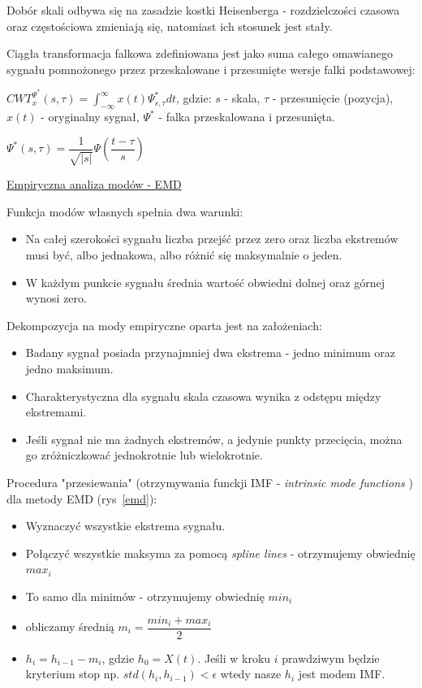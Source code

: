 Dobór skali odbywa się na zasadzie kostki Heisenberga - rozdzielczości czasowa oraz częstościowa zmieniają się, natomiast ich stosunek jest stały.

Ciągła transformacja falkowa zdefiniowana jest jako suma całego omawianego sygnału
pomnożonego przez przeskalowane i przesunięte wersje falki podstawowej:

$ CWT_x^{\Psi^*} (s, \tau) = \int_{-\infty}^{\infty} x(t) \Psi^*_{s, \tau} dt $, gdzie: \newline
$ s $ - skala, \newline
$ \tau $ - przesunięcie (pozycja), \newline
$ x(t) $ - oryginalny sygnał, \newline
$ \Psi^* $ - falka przeskalowana i przesunięta.

$ \Psi^*(s, \tau) = \dfrac{1}{\sqrt{|s|}} \Psi(\dfrac{t- \tau}{s}) $

\underline{Empiryczna analiza modów - EMD}

Funkcja modów własnych spełnia dwa warunki:
\begin{itemize}
	\item Na całej szerokości sygnału liczba przejść przez zero oraz liczba ekstremów musi być, albo jednakowa, albo różnić się maksymalnie o jeden.
	\item W każdym punkcie sygnału średnia wartość obwiedni dolnej oraz górnej wynosi zero.
\end{itemize}

Dekompozycja na mody empiryczne oparta jest na założeniach:\newline
\begin{itemize}
	\item Badany sygnał posiada przynajmniej dwa ekstrema - jedno minimum oraz jedno maksimum.
	\item Charakterystyczna dla sygnału skala czasowa wynika z odstępu między ekstremami.
	\item Jeśli sygnał nie ma żadnych ekstremów, a jedynie punkty przecięcia, można go zróżniczkować jednokrotnie lub wielokrotnie.
\end{itemize}

Procedura "przesiewania" (otrzymywania funckji IMF - \textit{intrinsic mode functions} ) dla metody EMD (rys~\ref{emd}):
\begin{itemize}
	\item Wyznaczyć wszystkie ekstrema sygnału.
	\item Połączyć wszystkie maksyma za pomocą \textit{spline lines} - otrzymujemy obwiednię $ max_i $
	\item To samo dla minimów - otrzymujemy obwiednię $ min_i $
	\item obliczamy średnią $ m_i = \dfrac{min_i + max_i}{2} $
	\item $ h_i = h_{i-1} - m_i $, gdzie $ h_0 = X(t) $. Jeśli w kroku $ i $ prawdziwym będzie kryterium stop np. $ std(h_i, h_{i-1}) < \epsilon $ wtedy nasze $ h_i $ jest modem IMF.
\end{itemize}

